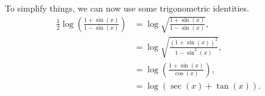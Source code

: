 To simplify things, we can now use some trigonometric identities.
\begin{align}
\frac{1}{2} \log\left(\frac{1 + \sin(x)}{1 - \sin(x)}\right) & = \log\sqrt{\frac{1 + \sin(x)}{1 - \sin(x)}}, \\
    & = \log\sqrt{\frac{(1 + \sin(x))^2}{1 - \sin^2(x)}}, \\
    & = \log\left(\frac{1 + \sin(x)}{\cos(x)}\right), \\
    & = \log(\sec(x) + \tan(x)).
\end{align}
